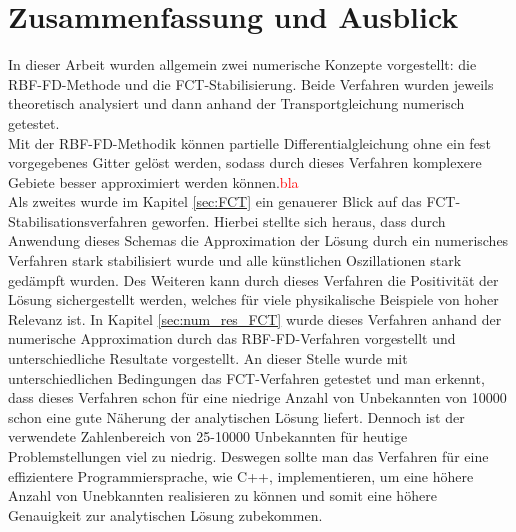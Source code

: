 \documentclass[12pt,titlepage]{article}
\newcommand{\col}[2][red]{\textcolor{#1}{#2}}
\begin{document}
\section{Zusammenfassung und Ausblick}
In dieser Arbeit wurden allgemein zwei numerische Konzepte vorgestellt: die RBF-FD-Methode und die FCT-Stabilisierung. Beide Verfahren wurden jeweils theoretisch analysiert und dann anhand der Transportgleichung numerisch getestet.\\
Mit der RBF-FD-Methodik können partielle Differentialgleichung ohne ein fest vorgegebenes Gitter gelöst werden, sodass durch dieses Verfahren komplexere Gebiete besser approximiert werden können.\col{bla}\\
Als zweites wurde im Kapitel \ref{sec:FCT} ein genauerer Blick auf das FCT-Stabilisationsverfahren geworfen. Hierbei stellte sich heraus, dass durch Anwendung dieses Schemas die Approximation der Lösung durch ein numerisches Verfahren stark stabilisiert wurde und alle künstlichen Oszillationen stark gedämpft wurden. Des Weiteren kann durch dieses Verfahren die Positivität der Lösung sichergestellt werden, welches für viele physikalische Beispiele von hoher Relevanz ist. In Kapitel \ref{sec:num_res_FCT} wurde dieses Verfahren anhand der numerische Approximation durch das RBF-FD-Verfahren vorgestellt und unterschiedliche Resultate vorgestellt. An dieser Stelle wurde mit unterschiedlichen Bedingungen das FCT-Verfahren getestet und man erkennt, dass dieses Verfahren schon für eine niedrige Anzahl von Unbekannten von 10000 schon eine gute Näherung der analytischen Lösung liefert. Dennoch ist der verwendete Zahlenbereich von 25-10000 Unbekannten für heutige Problemstellungen viel zu niedrig. Deswegen  sollte man das Verfahren für eine effizientere Programmiersprache, wie C++, implementieren, um eine höhere Anzahl von Unebkannten realisieren zu können und somit eine höhere Genauigkeit zur analytischen Lösung zubekommen.
\newpage
{}
\setcounter{page}{3}
\appendix


\end{document}
